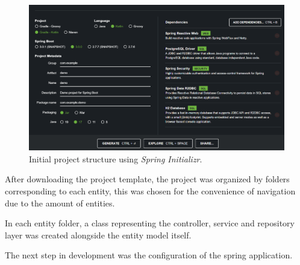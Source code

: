 \begin{figure}[H]
    \centering
    \includegraphics[scale=0.35]{Chapters/img/misc/spring-io.png}
    \caption{Initial project structure using \textit{Spring Initializr}.}
    \label{fig:spring-io-start}
\end{figure}

After downloading the project template, the project was organized by folders corresponding to each entity, this was chosen for the convenience of navigation due to the amount of entities.

In each entity folder, a class representing the controller, service and repository layer was created alongside the entity model itself.

The next step in development was the configuration of the spring application.

